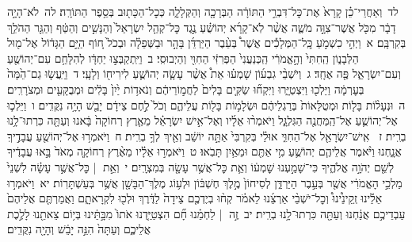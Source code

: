 \documentclass[18pt]{article}
\newcommand{\kri}[1]{\Afootnote{#1}}	%
\begin{document}
 {\loc לד~}וְאַחֲרֵי־כֵ֗ן קָרָא֙ אֶת־כׇּל־דִּבְרֵ֣י הַתּוֹרָ֔ה הַבְּרָכָ֖ה וְהַקְּלָלָ֑ה כְּכׇל־הַכָּת֖וּב בְּסֵ֥פֶר הַתּוֹרָֽה׃ \startlock
 {\loc לה~}לֹא־הָיָ֣ה דָבָ֔ר מִכֹּ֖ל אֲשֶׁר־צִוָּ֣ה מֹשֶׁ֑ה אֲשֶׁ֨ר לֹֽא־קָרָ֜א יְהוֹשֻׁ֗עַ נֶ֣גֶד כׇּל־קְהַ֤ל יִשְׂרָאֵל֙ וְהַנָּשִׁ֣ים וְהַטַּ֔ף וְהַגֵּ֖ר הַהֹלֵ֥ךְ בְּקִרְבָּֽם׃ 
\startlock
 {\loc א~}וַיְהִ֣י כִשְׁמֹ֣עַ כׇּֽל־הַמְּלָכִ֡ים אֲשֶׁר֩ בְּעֵ֨בֶר הַיַּרְדֵּ֜ן בָּהָ֣ר וּבַשְּׁפֵלָ֗ה וּבְכֹל֙ ח֚וֹף הַיָּ֣ם הַגָּד֔וֹל אֶל־מ֖וּל הַלְּבָנ֑וֹן הַֽחִתִּי֙ וְהָ֣אֱמֹרִ֔י הַֽכְּנַעֲנִי֙ הַפְּרִזִּ֔י הַחִוִּ֖י וְהַיְבוּסִֽי׃ \startlock
 {\loc ב~}וַיִּֽתְקַבְּצ֣וּ יַחְדָּ֔ו לְהִלָּחֵ֥ם עִם־יְהוֹשֻׁ֖עַ וְעִם־יִשְׂרָאֵ֑ל פֶּ֖ה אֶחָֽד׃ \startlock
 {\loc ג~}וְיֹשְׁבֵ֨י גִבְע֜וֹן שָׁמְע֗וּ אֵת֩ אֲשֶׁ֨ר עָשָׂ֧ה יְהוֹשֻׁ֛עַ לִירִיח֖וֹ וְלָעָֽי׃ \startlock
 {\loc ד~}וַיַּֽעֲשׂ֤וּ גַם־הֵ֙מָּה֙ בְּעׇרְמָ֔ה וַיֵּלְכ֖וּ וַיִּצְטַיָּ֑רוּ וַיִּקְח֞וּ שַׂקִּ֤ים בָּלִים֙ לַחֲמ֣וֹרֵיהֶ֔ם וְנֹאד֥וֹת יַ֙יִן֙ בָּלִ֔ים וּמְבֻקָּעִ֖ים וּמְצֹרָרִֽים׃ \startlock
 {\loc ה~}וּנְעָל֨וֹת בָּל֤וֹת וּמְטֻלָּאוֹת֙ בְּרַגְלֵיהֶ֔ם וּשְׂלָמ֥וֹת בָּל֖וֹת עֲלֵיהֶ֑ם וְכֹל֙ לֶ֣חֶם צֵידָ֔ם יָבֵ֖שׁ הָיָ֥ה נִקֻּדִֽים׃ \startlock
 {\loc ו~}וַיֵּלְכ֧וּ אֶל־יְהוֹשֻׁ֛עַ אֶל־הַֽמַּחֲנֶ֖ה הַגִּלְגָּ֑ל וַיֹּאמְר֨וּ אֵלָ֜יו וְאֶל־אִ֣ישׁ יִשְׂרָאֵ֗ל מֵאֶ֤רֶץ רְחוֹקָה֙ בָּ֔אנוּ וְעַתָּ֖ה כִּרְתוּ־לָ֥נוּ בְרִֽית׃ \startlock
 {\loc ז~}\edtext{(ויאמרו)}{\kri{קרי: וַיֹּ֥אמֶר}}  אִֽישׁ־יִשְׂרָאֵ֖ל אֶל־הַחִוִּ֑י אוּלַ֗י בְּקִרְבִּי֙ אַתָּ֣ה יוֹשֵׁ֔ב וְאֵ֖יךְ  \edtext{(אכרות)}{\kri{קרי: אֶֽכְרׇת־}} לְךָ֥ בְרִֽית׃ \startlock
 {\loc ח~}וַיֹּאמְר֥וּ אֶל־יְהוֹשֻׁ֖עַ עֲבָדֶ֣יךָֽ אֲנָ֑חְנוּ וַיֹּ֨אמֶר אֲלֵיהֶ֧ם יְהוֹשֻׁ֛עַ מִ֥י אַתֶּ֖ם וּמֵאַ֥יִן תָּבֹֽאוּ׃ \startlock
 {\loc ט~}וַיֹּאמְר֣וּ אֵלָ֗יו מֵאֶ֨רֶץ רְחוֹקָ֤ה מְאֹד֙ בָּ֣אוּ עֲבָדֶ֔יךָ לְשֵׁ֖ם יְהֹוָ֣ה אֱלֹהֶ֑יךָ כִּי־שָׁמַ֣עְנוּ שׇׁמְע֔וֹ וְאֵ֛ת כׇּל־אֲשֶׁ֥ר עָשָׂ֖ה בְּמִצְרָֽיִם׃ \startlock
 {\loc י~}וְאֵ֣ת  |  כׇּל־אֲשֶׁ֣ר עָשָׂ֗ה לִשְׁנֵי֙ מַלְכֵ֣י הָאֱמֹרִ֔י אֲשֶׁ֖ר בְּעֵ֣בֶר הַיַּרְדֵּ֑ן לְסִיחוֹן֙ מֶ֣לֶךְ חֶשְׁבּ֔וֹן וּלְע֥וֹג מֶלֶךְ־הַבָּשָׁ֖ן אֲשֶׁ֥ר בְּעַשְׁתָּרֽוֹת׃ \startlock
 {\loc יא~}וַיֹּאמְר֣וּ אֵלֵ֡ינוּ זְֽקֵינֵ֩ינוּ֩ וְכׇל־יֹשְׁבֵ֨י אַרְצֵ֜נוּ לֵאמֹ֗ר קְח֨וּ בְיֶדְכֶ֤ם צֵידָה֙ לַדֶּ֔רֶךְ וּלְכ֖וּ לִקְרָאתָ֑ם וַאֲמַרְתֶּ֤ם אֲלֵיהֶם֙ עַבְדֵיכֶ֣ם אֲנַ֔חְנוּ וְעַתָּ֖ה כִּרְתוּ־לָ֥נוּ בְרִֽית׃ \startlock
 {\loc יב~}זֶ֣ה  |  לַחְמֵ֗נוּ חָ֞ם הִצְטַיַּ֤דְנוּ אֹתוֹ֙ מִבָּ֣תֵּ֔ינוּ בְּי֥וֹם צֵאתֵ֖נוּ לָלֶ֣כֶת אֲלֵיכֶ֑ם וְעַתָּה֙ הִנֵּ֣ה יָבֵ֔שׁ וְהָיָ֖ה נִקֻּדִֽים׃ \startlock
\end{document}

